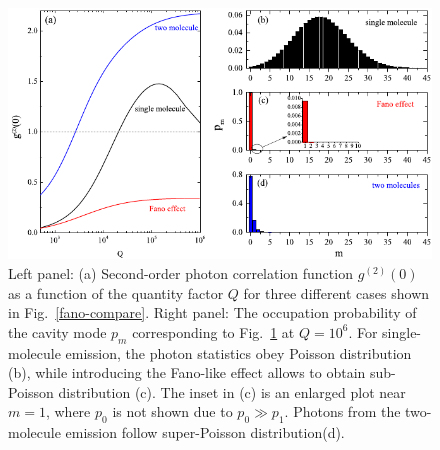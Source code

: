 \documentclass[aps,prb,
,floatfix,footinbib,longbibliography,
preprint
]{revtex4-2}
\begin{document}
\begin{figure}[h]
\centering
\includegraphics[width=12cm]{fano-rp-mix01.pdf}
\caption{Left panel: (a) Second-order photon correlation function $g^{(2)}(0)$ as a function of the quantity factor $Q$ for three different cases shown in Fig.~\ref{fano-compare}. Right panel: The occupation probability of the cavity mode $p_{m}$ corresponding to Fig.~\ref{fano-rp} at $Q=10^{6}$.
For single-molecule emission, the photon statistics obey Poisson distribution (b), while introducing the Fano-like effect allows to obtain sub-Poisson distribution (c). The inset in (c) is an enlarged plot near $m=1$, where $p_{0}$ is not shown due to $p_{0}\gg p_{1}$. Photons  from the two-molecule emission follow super-Poisson distribution(d).}
\label{fano-rp}
\end{figure}
\end{document}
